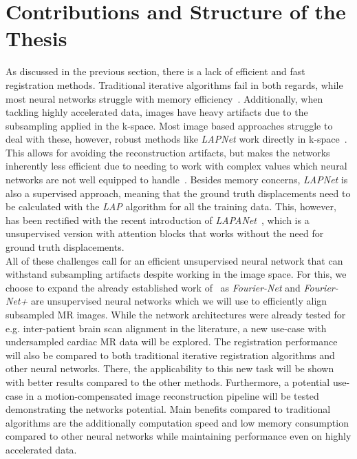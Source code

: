 \section{Contributions and Structure of the Thesis} \label{Sec:ContributionsAndStructure}
As discussed in the previous section, there is a lack of efficient and fast registration methods. Traditional iterative algorithms fail in both regards, while most neural networks struggle with memory efficiency~\cite{Fourier-Net,Fourier-Net+}. Additionally, when tackling highly accelerated data, images have heavy artifacts due to the subsampling applied in the k-space. Most image based approaches struggle to deal with these, however, robust methods like \emph{LAPNet} work directly in k-space~\cite{LAPNet}. This allows for avoiding the reconstruction artifacts, but makes the networks inherently less efficient due to needing to work with complex values which neural networks are not well equipped to handle~\cite{Trabelsi2017}. Besides memory concerns, \emph{LAPNet} is also a supervised approach, meaning that the ground truth displacements need to be calculated with the \emph{LAP} algorithm for all the training data. This, however, has been rectified with the recent introduction of \emph{LAPANet}~\cite{LAPANet}, which is a unsupervised version with attention blocks that works without the need for ground truth displacements.\\
All of these challenges call for an efficient unsupervised neural network that can withstand subsampling artifacts despite working in the image space. For this, we choose to expand the already established work of~\cite{Fourier-Net,Fourier-Net+} as \emph{Fourier-Net} and \emph{Fourier-Net+} are unsupervised neural networks which we will use to efficiently align subsampled MR images. While the network architectures were already tested for e.g. inter-patient brain scan alignment in the literature, a new use-case with undersampled cardiac MR data will be explored. The registration performance will also be compared to both traditional iterative registration algorithms and other neural networks. There, the applicability to this new task will be shown with better results compared to the other methods. Furthermore, a potential use-case in a motion-compensated image reconstruction pipeline will be tested demonstrating the networks potential. Main benefits compared to traditional algorithms are the additionally computation speed and low memory consumption compared to other neural networks while maintaining performance even on highly accelerated data.\\
